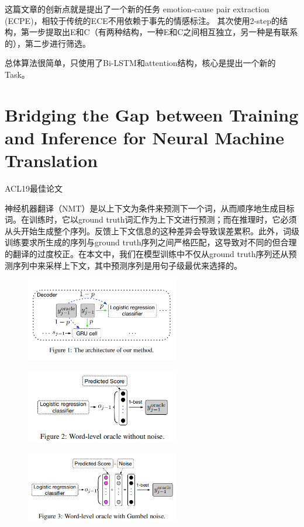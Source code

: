 \documentclass[a4paper,UTF8]{article}
\numberwithin{equation}{section}
\begin{document}
这篇文章的创新点就是提出了一个新的任务 emotion-cause pair extraction (ECPE)，相较于传统的ECE不用依赖于事先的情感标注。
其次使用2-step的结构，第一步提取出E和C（有两种结构，一种E和C之间相互独立，另一种是有联系的），第二步进行筛选。

总体算法很简单，只使用了Bi-LSTM和attention结构，核心是提出一个新的Task。

\newpage
\section{Bridging the Gap between Training and Inference for Neural Machine Translation}
ACL19最佳论文

神经机器翻译（NMT）是以上下文为条件来预测下一个词，从而顺序地生成目标词。在训练时，它以ground truth词汇作为上下文进行预测；而在推理时，它必须从头开始生成整个序列。反馈上下文信息的这种差异会导致误差累积。此外，词级训练要求所生成的序列与ground truth序列之间严格匹配，这导致对不同的但合理的翻译的过度校正。在本文中，我们在模型训练中不仅从ground truth序列还从预测序列中来采样上下文，其中预测序列是用句子级最优来选择的。
\begin{figure}[H]
	\centering
	\includegraphics[width=0.6\textwidth]{4-1.png}
\end{figure}
\begin{figure}[H]
	\centering
	\includegraphics[width=0.6\textwidth]{4-2.png}
\end{figure}
\begin{figure}[H]
	\centering
	\includegraphics[width=0.6\textwidth]{4-3.png}
\end{figure}
\end{document}
